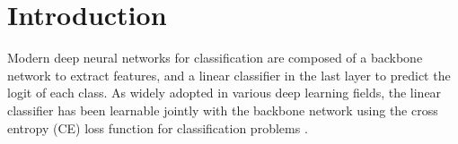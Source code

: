 \documentclass{article}
\newcommand{\<}{\left\langle}
\renewcommand{\>}{\right\rangle}
\begin{document}
\vspace{-3mm}

\section{Introduction}
\vspace{-2mm}
\label{intro}
Modern deep neural networks for classification are composed of a backbone network to extract features, and a linear classifier in the last layer to predict the logit of each class. As widely adopted in various deep learning fields, the linear classifier has been learnable jointly with the backbone network using the cross entropy (CE) loss function for classification problems \cite{lecun2015deep,he2016deep,huang2017densely}. 




\iffalse
\begin{figure}[!t]
\begin{center}
\texttt{[image: fig1.pdf]}
		\vspace{-2mm}
		\caption{An illustration of a simplex equiangular tight frame when  and . The black spheres are the vertices of the ETF. The  ``+'' and asterisks signs in different colors refer to features and classifier vectors of different classes, respectively. Neural collapse depicts the phenomenon that the last-layer feature means and the corresponding classifier vectors converge to the same ETF.}
		\label{fig1}
	\end{center}
	\vskip -0.2in
\end{figure}
\fi
\end{document}
